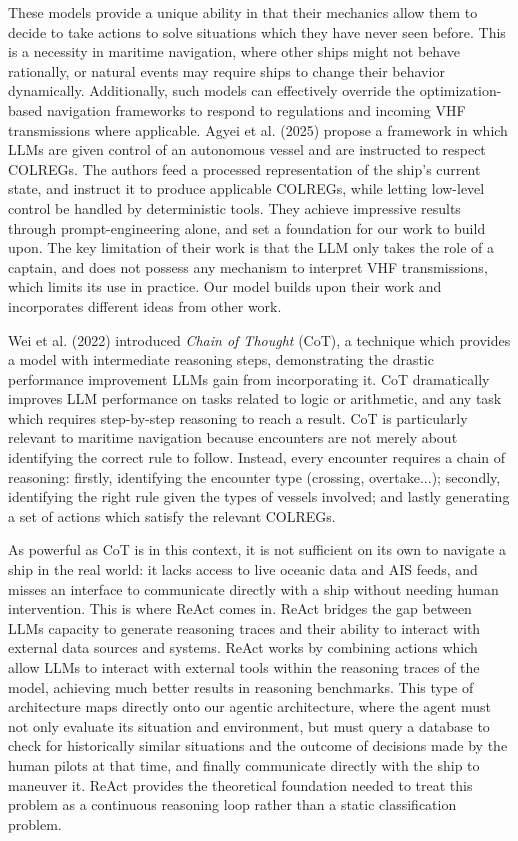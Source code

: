 \documentclass[10pt]{reportMaster}
\begin{document}
These models provide a unique ability in that their mechanics allow them to decide to take actions to solve situations which they have never seen before. This is a necessity in maritime navigation, where other ships might not behave rationally, or natural events may require ships to change their behavior dynamically. Additionally, such models can effectively override the optimization-based navigation frameworks to respond to regulations and incoming VHF transmissions where applicable. Agyei et al. (2025) propose a framework in which LLMs are given control of an autonomous vessel and are instructed to respect COLREGs\cite{agyei2025largelanguagemodelbaseddecisionmaking}. The authors feed a processed representation of the ship's current state, and instruct it to produce applicable COLREGs, while letting low-level control be handled by deterministic tools. They achieve impressive results through prompt-engineering alone, and set a foundation for our work to build upon. The key limitation of their work is that the LLM only takes the role of a captain, and does not possess any mechanism to interpret VHF transmissions, which limits its use in practice. Our model builds upon their work and incorporates different ideas from other work.

Wei et al. (2022) introduced \textit{Chain of Thought} (CoT), a technique which provides a model with intermediate reasoning steps, demonstrating the drastic performance improvement LLMs gain from incorporating it. CoT dramatically improves LLM performance on tasks related to logic or arithmetic, and any task which requires step-by-step reasoning to reach a result. CoT is particularly relevant to maritime navigation because encounters are not merely about identifying the correct rule to follow. Instead, every encounter requires a chain of reasoning: firstly, identifying the encounter type (crossing, overtake...); secondly, identifying the right rule given the types of vessels involved; and lastly generating a set of actions which satisfy the relevant COLREGs.

As powerful as CoT is in this context, it is not sufficient on its own to navigate a ship in the real world: it lacks access to live oceanic data and AIS feeds, and misses an interface to communicate directly with a ship without needing human intervention. This is where ReAct\cite{yao2023reactsynergizingreasoningacting} comes in. ReAct bridges the gap between LLMs capacity to generate reasoning traces and their ability to interact with external data sources and systems. ReAct works by combining actions which allow LLMs to interact with external tools within the reasoning traces of the model, achieving much better results in reasoning benchmarks. This type of architecture maps directly onto our agentic architecture, where the agent must not only evaluate its situation and environment, but must query a database to check for historically similar situations and the outcome of decisions made by the human pilots at that time, and finally communicate directly with the ship to maneuver it. ReAct provides the theoretical foundation needed to treat this problem as a continuous reasoning loop rather than a static classification problem. 
\end{document}
